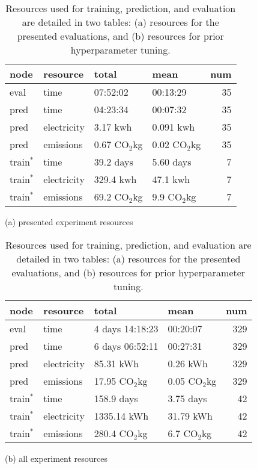 \documentclass[10pt,twocolumn,letterpaper]{article}
\newcommand{\cotwo}{\ensuremath{\mathrm{CO_2}}}
\begin{document}
\begin{table}[t]
    \centering
\begin{tabular}{llllr}
\toprule
        node & resource &           total &            mean &  num \\
\midrule
eval  & time            & 07:52:02 &  00:13:29 &   35 \\
\midrule
pred  & time            & 04:23:34 &  00:07:32 &   35 \\
pred  & electricity     & 3.17 kwh &     0.091 kwh&   35 \\
pred  & emissions       & 0.67 \cotwo kg &     0.02 \cotwo kg &   35 \\
\midrule
train$^{*}$ &   time    & 39.2 days  & 5.60 days&   7 \\
train$^{*}$ &   electricity  & 329.4 kwh &     47.1 kwh &   7 \\
train$^{*}$ &   emissions & 69.2 \cotwo kg &     9.9 \cotwo kg &   7 \\
\bottomrule
\end{tabular}
(a) presented experiment resources
\begin{tabular}{llllr}
\toprule
        node & resource &           total &            mean &  num \\
\midrule
eval & time & 4 days 14:18:23 & 00:20:07 &  329 \\
\midrule
pred & time & 6 days 06:52:11 & 00:27:31 &  329 \\
pred & electricity &       85.31 kWh &        0.26 kWh &  329 \\
pred & emissions &       17.95 \cotwo kg &        0.05 \cotwo kg &  329 \\
\midrule
train$^{*}$ &   time &        158.9 days &         3.75 days &   42 \\
train$^{*}$ & electricity &   1335.14 kWh &       31.79 kWh &   42 \\
train$^{*}$ & emissions &   280.4 \cotwo kg &        6.7 \cotwo kg &   42 \\
\bottomrule
\end{tabular}
(b) all experiment resources
\label{tab:resources}
\caption[]{
Resources used for training, prediction, and evaluation are detailed in two tables:
(a) resources for the presented evaluations, and (b) resources for prior hyperparameter tuning.
}
\end{table}
\end{document}
